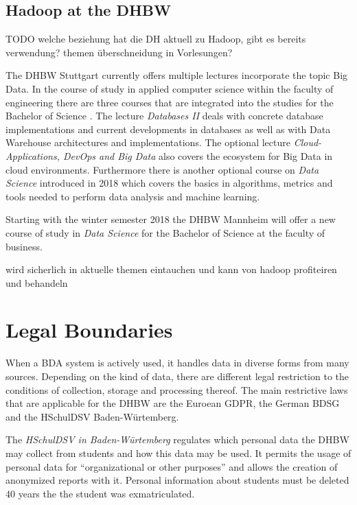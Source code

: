 \subsection{Hadoop at the DHBW}

TODO welche beziehung hat die DH aktuell zu Hadoop, gibt es bereits verwendung? themen überschneidung in Vorlesungen?


The \ac{DHBW} Stuttgart currently offers multiple lectures incorporate the topic Big Data.
In the course of study in applied computer science within the faculty of engineering there are three courses that are integrated into the studies for the Bachelor of Science .
The lecture \emph{Databases II} deals with concrete database implementations and current developments in databases as well as with Data Warehouse architectures and implementations.
\autocite[][]{DHBW2017aidbii}
The optional lecture \emph{Cloud-Applications, DevOps and Big Data} also covers the ecosystem for Big Data in cloud environments. \autocite[][]{DHBW2017aiwf}
Furthermore there is another optional course on \emph{Data Science} introduced in 2018 which covers the basics in algorithms, metrics and tools needed to perform data analysis and machine learning.

Starting with the winter semester 2018 the \ac{DHBW} Mannheim will offer a new course of study in \emph{Data Science} for the Bachelor of Science at the faculty of business.


wird sicherlich in aktuelle themen eintauchen und kann von hadoop profiteiren und behandeln


\section{Legal Boundaries}
\label{sec:fund:legal}

When a \ac{BDA} system is actively used, it handles data in diverse forms from many sources.
Depending on the kind of data, there are different legal restriction 
to the conditions of collection, storage and processing thereof.
The main restrictive laws that are applicable for the \ac{DHBW} are the Euroean \ac{GDPR}, the German \ac{BDSG} and the \ac{HSchulDSV} Baden-Würtemberg.

The \emph{\ac{HSchulDSV} in Baden-Würtemberg}  regulates which personal data the \ac{DHBW} may collect from students and how this data may be used.
It permits the usage of personal data for \enquote{organizational or other purposes} and allows the creation of anonymized reports with it.
Personal information about students must be deleted 40 years the the student was exmatriculated. 
\autocite[][§1, §11, §12]{bw2012hcchuldsv}

